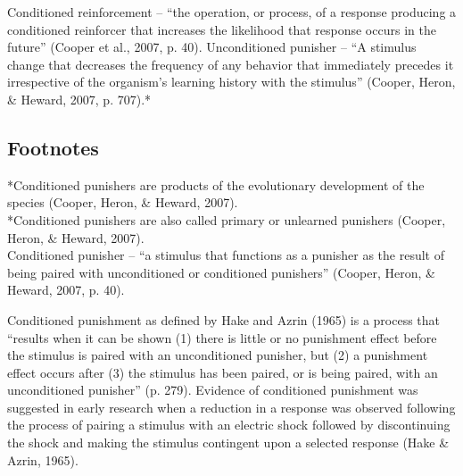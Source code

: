 Conditioned reinforcement – ``the operation, or process, of a response producing a conditioned reinforcer that increases the likelihood that response occurs in the future'' (Cooper et al., 2007, p. 40).
%
Unconditioned punisher – ``A stimulus change that decreases the frequency of any behavior that immediately precedes it irrespective of the organism's learning history with the stimulus'' (Cooper, Heron, \& Heward, 2007, p. 707).*
%
\subsection{Footnotes}
*Conditioned punishers are products of the evolutionary development of the species (Cooper, Heron, \& Heward, 2007).\\
*Conditioned punishers are also called primary or unlearned punishers (Cooper, Heron, \& Heward, 2007).\\
%
Conditioned punisher – ``a stimulus that functions as a punisher as the result of being paired with unconditioned or conditioned punishers'' (Cooper, Heron, \& Heward, 2007, p. 40).

Conditioned punishment as defined by Hake and Azrin (1965) is a process that ``results when it can be shown (1) there is little or no punishment effect before the stimulus is paired with an unconditioned punisher, but (2) a punishment effect occurs after (3) the stimulus has been paired, or is being paired, with an unconditioned punisher'' (p. 279).  Evidence of conditioned punishment was suggested in early research when a reduction in a response was observed following the process of pairing a stimulus with an electric shock followed by discontinuing the shock and making the stimulus contingent upon a selected response (Hake \& Azrin, 1965).

